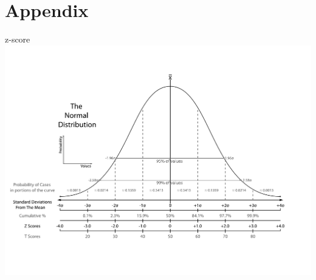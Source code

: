 \documentclass[12pt, t, xcolor=dvipsnames]{beamer}
\begin{document}
\section{Appendix}
\begin{frame}[fragile]{z-score}
\includegraphics[width=\textwidth, keepaspectratio]{zscore}
\end{frame}
% 
% 
% 
% 
% 
% 
\end{document}
